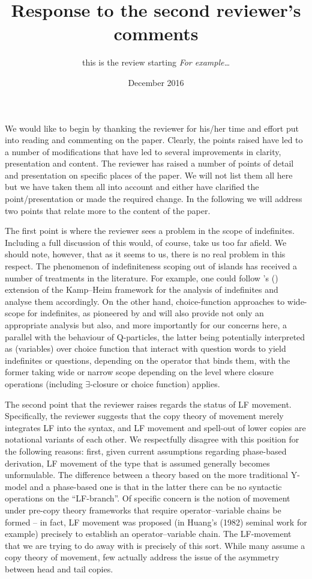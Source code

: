 \documentclass[11pt]{article}
\newcommand{\citeposs}[1]{\citeauthor{#1}'s (\citeyear{#1})}
\begin{document}
\title{Response to the second reviewer's comments}
\author{this is the review starting \textit{For example\ldots}}
\date{December 2016}

\maketitle
We would like to begin by thanking the reviewer for his/her time and effort put into reading and commenting on the paper. Clearly, the points raised have led to a number of modifications that have led to several improvements in clarity, presentation and content.  The reviewer has raised a number of points of detail and presentation on specific places of the paper. We will not list them all here but we have taken them all into account and either have clarified the point/presentation or made the required change. In the following we will address two points that relate more to the content of the paper.

The first point is where the reviewer sees a problem in the scope of indefinites. Including a full discussion of this would, of course, take us too far afield. We should note, however, that as it seems to us, there is no real problem in this respect. The phenomenon of indefiniteness scoping out of islands has received a number of treatments in the literature.  For example, one could follow \citeposs{abusch:1994a} extension of the Kamp--Heim framework for the analysis of indefinites and analyse them accordingly. On the other hand, choice-function approaches to wide-scope for indefinites, as pioneered by \citet{reinhart:1997} and \citet{winter:1997a} will also provide not only an appropriate analysis but also, and more importantly for our concerns here, a parallel with the behaviour of Q-particles, the latter being potentially interpreted as (variables) over choice function that interact with question words to yield indefinites or questions, depending on the operator that binds them, with the former taking wide or narrow scope depending on the level where closure operations (including $\exists$-closure or choice function) applies.

The second point that the reviewer raises regards the status of LF movement. Specifically, the reviewer suggests that the copy theory of movement merely integrates LF into the syntax, and LF movement and spell-out of lower copies are notational variants of each other. We respectfully disagree with this position for the following reasons: first, given current assumptions regarding phase-based derivation, LF movement of the type that is assumed generally becomes unformulable. The difference between a theory based on the more traditional Y-model and a phase-based one is that in the latter there can be no syntactic operations on the ``LF-branch''. Of specific concern is the notion of movement under pre-copy theory frameworks that require operator--variable chains be formed -- in fact, LF movement was proposed (in Huang's (1982) seminal work for example) precisely to establish an operator--variable chain. The LF-movement that we are trying to do away with is precisely of this sort. While many assume a copy theory of movement, few actually address the issue of the asymmetry between head and tail copies.
\end{document}
